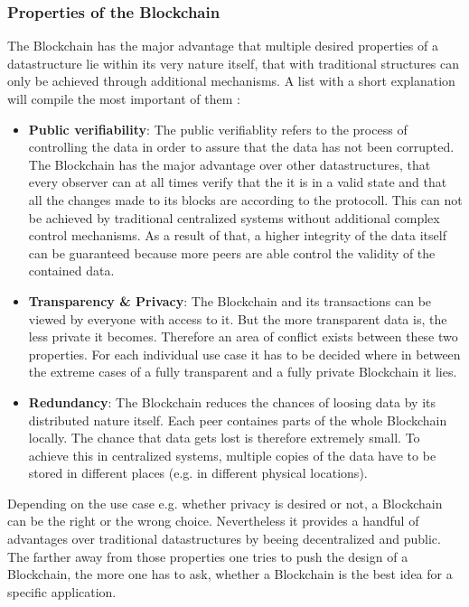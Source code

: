 \subsubsection{Properties of the Blockchain}
The Blockchain has the major advantage that multiple desired properties of a datastructure lie within its very nature itself, that with traditional structures can only be achieved through additional mechanisms. A list with a short explanation will compile the most important of them \cite{Wust2017}:
\begin{itemize}
	\item \textbf{Public verifiability}: The public verifiablity refers to the process of controlling the data in order to assure that the data has not been corrupted. The Blockchain has the major advantage over other datastructures, that every observer can at all times verify that the it is in a valid state and that all the changes made to its blocks are according to the protocoll. This can not be achieved by traditional centralized systems without additional complex control mechanisms.
	  As a result of that, a higher integrity of the data itself can be guaranteed because more peers are able control the validity of the contained data.
	\item \textbf{Transparency \& Privacy}: The Blockchain and its transactions can be viewed by everyone with access to it. But the more transparent data is, the less private it becomes. Therefore an area of conflict exists between these two properties. For each individual use case it has to be decided where in between the extreme cases of a fully transparent and a fully private Blockchain it lies.
	
	\item \textbf{Redundancy}: The Blockchain reduces the chances of loosing data by its distributed nature itself. Each peer containes parts of the whole Blockchain locally. The chance that data gets lost is therefore extremely small. To achieve this in centralized systems, multiple copies of the data have to be stored in different places (e.g. in different physical locations).
\end{itemize}
Depending on the use case e.g. whether privacy is desired or not, a Blockchain can be the right or the wrong choice. Nevertheless it provides a handful of advantages over traditional datastructures by beeing decentralized and public. The farther away from those properties one tries to push the design of a Blockchain, the more one has to ask, whether a Blockchain is the best idea for a specific application.
